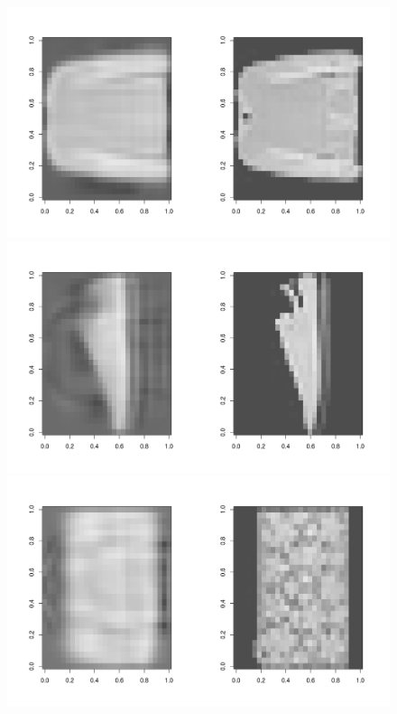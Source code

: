 \documentclass{article}
\begin{document}
\begin{figure}[H] 
\centering
\includegraphics[width=\textwidth, trim=0 0 0 5cm]{pca_reconst_6.png}
\includegraphics[width=\textwidth]{pca_reconst_7.png}
\includegraphics[width=\textwidth]{pca_reconst_8.png}
\label{fig:pca_ellipse}
\end{figure}
\end{document}
